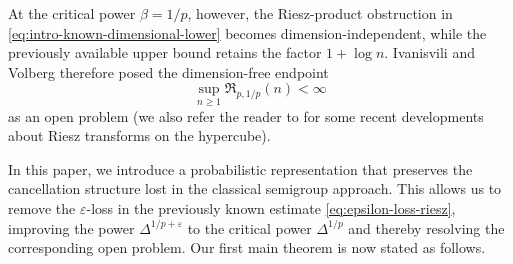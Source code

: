 \documentclass{amsart}
\numberwithin{equation}{section}
\theoremstyle{definition}
\theoremstyle{remark}
\newcommand{\1}{\mathbf 1}
\begin{document}
%

At the critical power $\beta=1/p$, however, the Riesz-product obstruction in \eqref{eq:intro-known-dimensional-lower} becomes dimension-independent,
while the previously available upper bound retains the factor
$1+\log n$. Ivanisvili and Volberg \cite{I-V2022} therefore posed the dimension-free endpoint
\[
 \sup_{n\geq1}\mathfrak R_{p,1/p}(n)<\infty
\]
as an open problem \cite[Section 8.1]{I-V2022} (we also refer the reader to \cite{ChenDai2026,DIPV2026} for some recent developments  about Riesz transforms on the hypercube).

In this paper, we introduce a probabilistic representation that preserves the
cancellation structure lost in the classical semigroup approach.  This allows us
to remove the $\varepsilon$-loss in the previously known estimate \eqref{eq:epsilon-loss-riesz},
improving the power $\Delta^{1/p+\varepsilon}$ to the critical power
$\Delta^{1/p}$ and thereby resolving the corresponding open problem.  Our first main theorem is now stated as follows.
\end{document}
